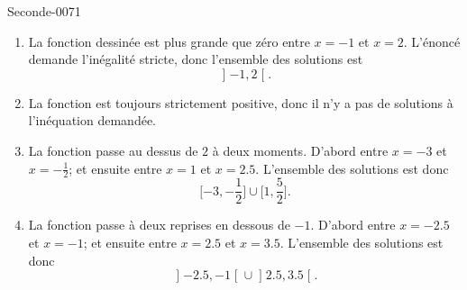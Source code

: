 
\begin{corrige}{Seconde-0071}

    \begin{enumerate}
        \item
            La fonction dessinée est plus grande que zéro entre \( x=-1\) et \( x=2\). L'énoncé demande l'inégalité stricte, donc l'ensemble des solutions est
            \begin{equation}
                \mathopen] -1 , 2 \mathclose[.
            \end{equation}
        \item
            La fonction est toujours strictement positive, donc il n'y a pas de solutions à l'inéquation demandée.
        \item
            La fonction passe au dessus de \( 2\) à deux moments. D'abord entre \( x=-3\) et \( x=-\frac{ 1 }{2}\); et ensuite entre \( x=1\) et \( x=2.5\). L'ensemble des solutions est donc
            \begin{equation}
                \mathopen[ -3 , -\frac{ 1 }{2} \mathclose]\cup\mathopen[ 1 , \frac{ 5 }{2} \mathclose].
            \end{equation}
        \item
            La fonction passe à deux reprises en dessous de \( -1\). D'abord entre \( x=-2.5\) et \( x=-1\); et ensuite entre \( x=2.5\) et \( x=3.5\). L'ensemble des solutions est donc
            \begin{equation}
                \mathopen] -2.5 , -1 \mathclose[\cup\mathopen] 2.5 , 3.5 \mathclose[.
            \end{equation}
    \end{enumerate}

\end{corrige}

